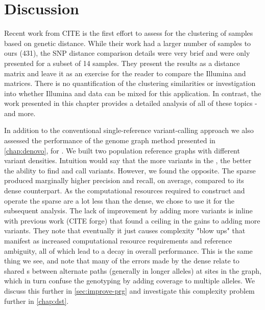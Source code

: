 
\section{Discussion}


Recent work from CITE \etal{} is the first effort to assess \ont{} for the clustering of \mtb{} samples based on genetic distance. While their work had a larger number of samples to ours (431), the SNP distance comparison details were very brief and were only presented for a subset of 14 samples. They present the results as a distance matrix and leave it as an exercise for the reader to compare the Illumina and \ont{} matrices. There is no quantification of the clustering similarities or investigation into whether Illumina and \ont{} data can be mixed for this application. In contrast, the work presented in this chapter provides a detailed analysis of all of these topics - and more.

In addition to the conventional single-reference variant-calling approach we also assessed the performance of the genome graph method presented in \autoref{chap:denovo}, for \mtb{}. We built two \mtb{} population reference graphs with different variant densities. Intuition would say that the more variants in the \prg{}, the better the ability to find and call variants. However, we found the opposite. The sparse \prg{} produced marginally higher precision and recall, on average, compared to its dense counterpart. As the computational resources required to construct and operate the sparse \prg{} are a lot less than the dense, we chose to use it for the subsequent analysis. The lack of improvement by adding more variants is inline with previous work (CITE forge) that found a ceiling in the gains to adding more variants. They note that eventually it just causes complexity "blow ups" that manifest as increased computational resource requirements and reference ambiguity, all of which lead to a decay in overall performance. This is the same thing we see, and note that many of the errors made by the dense \prg{} relate to shared \kmer{}s between alternate paths (generally in longer alleles) at sites in the graph, which in turn confuse the genotyping by adding coverage to multiple alleles. We discuss this further in \autoref{sec:improve-prg} and investigate this complexity problem further in \autoref{chap:dst}.

